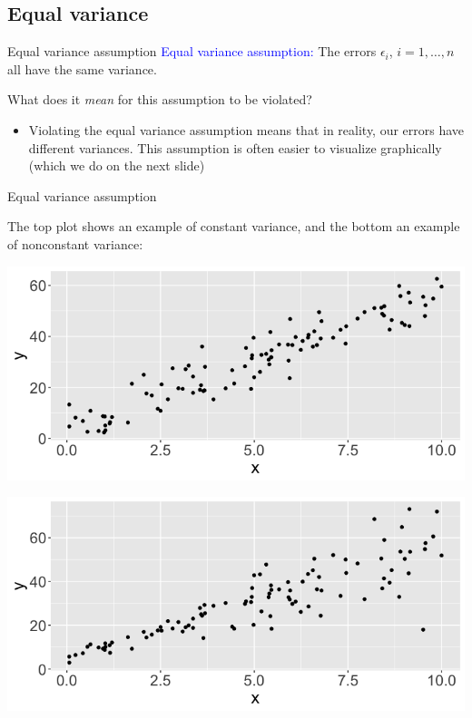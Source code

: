 \documentclass[10pt,t]{beamer}
\begin{document}
\subsection{Equal variance}

\begin{frame}{Equal variance assumption}
\textcolor{blue}{Equal variance assumption:} The errors $\epsilon_i$, $i = 1, \dots, n$ all have the same variance.

\vspace{0.3cm}

What does it \textit{mean} for this assumption to be violated?

\begin{itemize}
	\item[] Violating the equal variance assumption means that in reality, our errors have different variances. This assumption is often easier to visualize graphically (which we do on the next slide)
\end{itemize}

\end{frame}

\begin{frame}{Equal variance assumption}

The top plot shows an example of constant variance, and the bottom an example of nonconstant variance:

\vspace{0.3cm}

\centering

\includegraphics[scale=0.2]{constvar.png}

\includegraphics[scale=0.2]{nonconstvar.png}

\end{frame}
\end{document}

